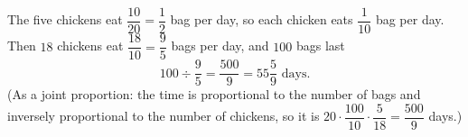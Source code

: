 The five chickens eat $\dfrac{10}{20}=\dfrac{1}{2}$ bag per day, so each chicken eats $\dfrac{1}{10}$ bag per day. Then $18$ chickens eat $\dfrac{18}{10}=\dfrac{9}{5}$ bags per day, and $100$ bags last
\[
100\div\dfrac{9}{5}=\boxed{\dfrac{500}{9}=55\dfrac{5}{9}\text{ days}}.
\]
(As a joint proportion: the time is proportional to the number of bags and inversely proportional to the number of chickens, so it is $20\cdot\dfrac{100}{10}\cdot\dfrac{5}{18}=\dfrac{500}{9}$ days.)
